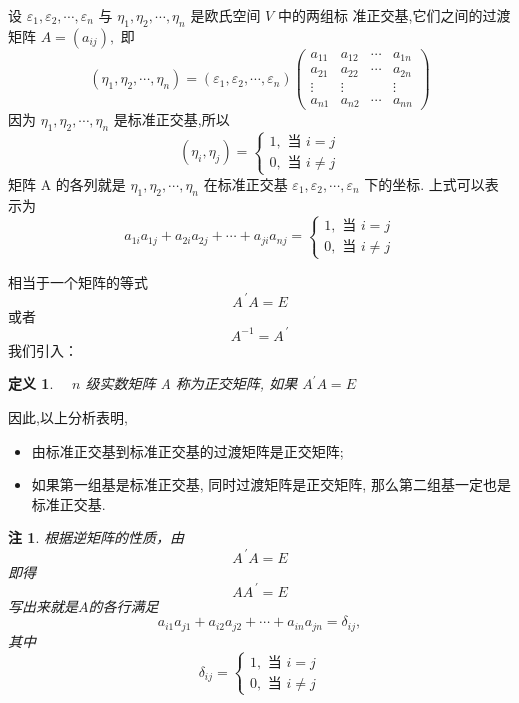 \documentclass[13pt]{beamer}
\newtheorem*{defi}{定义}
\newtheorem*{rem}{注}
\begin{document}
\begin{frame}
设 ${\varepsilon}_{1}, {\varepsilon}_{2}, \cdots, {\varepsilon}_{n}$ 与 ${\eta}_{1}, {\eta}_{2}, \cdots, {\eta}_{n}$ 是欧氏空间 $V$ 中的两组标
准正交基,它们之间的过渡矩阵 ${A}=\left(a_{i j}\right),$ 即
\[
\left(\eta_{1}, \eta_{2}, \cdots, \eta_{n}\right)=\left(\varepsilon_{1}, \varepsilon_{2}, \cdots, \varepsilon_{n}\right)\left(\begin{array}{cccc}
a_{11} & a_{12} & \cdots & a_{1 n} \\
a_{21} & a_{22} & \cdots & a_{2 n} \\
\vdots & \vdots & & \vdots \\
a_{n 1} & a_{n 2} & \cdots & a_{n n}
\end{array}\right)
\]
因为 ${\eta}_{1}, {\eta}_{2}, \cdots, {\eta}_{n}$ 是标准正交基,所以
\[
\left({\eta}_{i}, {\eta}_{j}\right)=\left\{\begin{array}{l}
1, \text { 当 } i=j \\
0, \text { 当 } i \neq j
\end{array}\right.
\]
矩阵 A 的各\alert{列}就是 ${\eta}_{1}, {\eta}_{2}, \cdots, {\eta}_{n}$ 在标准正交基 ${\varepsilon}_{1}, {\varepsilon}_{2}, \cdots, {\varepsilon}_{n}$ 下的坐标.
上式可以表示为
\[
a_{1 i} a_{1 j}+a_{2 i} a_{2 j}+\cdots+a_{j i} a_{n j}=\left\{\begin{array}{l}
1, \text { 当 } i=j \\
0, \text { 当 } i \neq j
\end{array}\right.
\]

\end{frame}




\begin{frame}
相当于一个矩阵的等式
\[
A^{\, \prime} A=E
\]
或者
\[
{A}^{-1}={A}^{\, \prime}
\]
我们引入： 
\begin{defi}
$\quad n$ 级实数矩阵 A 称为\alert{正交矩阵}, 如果  $A^{\prime} {A}={E}$
\end{defi}
 因此,以上分析表明,
 \begin{itemize}
	\item 由标准正交基到标准正交基的过渡矩阵是正交矩阵;
 	\item 如果第一组基是标准正交基, 同时过渡矩阵是正交矩阵, 那么第二组基一定也是标准正交基.
 \end{itemize}

\end{frame}


\begin{frame}
\begin{rem}
根据逆矩阵的性质，由
\[
{A}^{\, \prime} {A}={E}
\]
即得
\[
A A^{\, \prime}=E
\]
写出来就是$A$的各\alert{行}满足
\[
a_{i 1} a_{j 1}+a_{i 2} a_{j 2}+\cdots+a_{i n} a_{j n}=\delta_{i j}, 
\]
其中 \[
\delta_{i j}=
\left\{\begin{array}{l}
1, \text { 当 } i=j \\
0, \text { 当 } i \neq j
\end{array}\right.
\]
\end{rem}

\end{frame}
\end{document}
